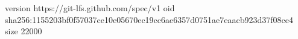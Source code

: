 version https://git-lfs.github.com/spec/v1
oid sha256:1155203bf0f57037ce10e05670ec19cc6ae6357d0751ae7eaacb923d37f08ce4
size 22000
